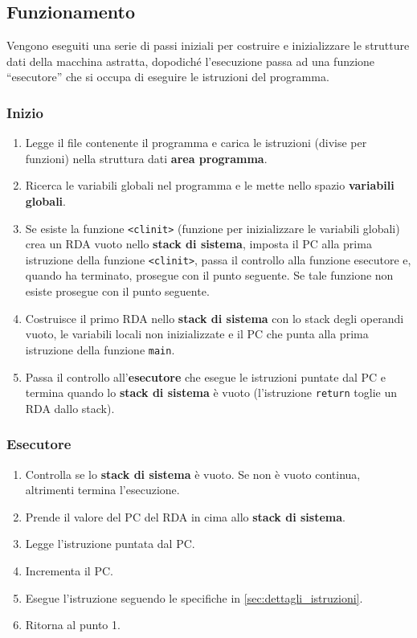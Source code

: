 \subsection{Funzionamento}
Vengono eseguiti una serie di passi iniziali per costruire e inizializzare le strutture dati della macchina astratta, dopodich\'e l'esecuzione passa ad una funzione ``esecutore'' che si occupa di eseguire le istruzioni del programma.

\subsubsection*{Inizio}
\begin{enumerate}
  \item Legge il file contenente il programma e carica le istruzioni (divise per funzioni) nella struttura dati \textbf{area programma}.
  \item Ricerca le variabili globali nel programma e le mette nello spazio \textbf{variabili globali}.
  \item Se esiste la funzione \texttt{<clinit>} (funzione per inizializzare le variabili globali) crea un RDA vuoto nello \textbf{stack di sistema}, imposta il PC alla prima istruzione della funzione \texttt{<clinit>}, passa il controllo alla funzione esecutore e, quando ha terminato, prosegue con il punto seguente. Se tale funzione non esiste prosegue con il punto seguente.
  \item Costruisce il primo RDA nello \textbf{stack di sistema} con lo stack degli operandi vuoto, le variabili locali non inizializzate e il PC che punta alla prima istruzione della funzione \texttt{main}.
  \item Passa il controllo all'\textbf{esecutore} che esegue le istruzioni puntate dal PC e termina quando lo \textbf{stack di sistema} \`e vuoto (l'istruzione \texttt{return} toglie un RDA dallo stack).
\end{enumerate}

\subsubsection*{Esecutore}
\begin{enumerate}
  \item Controlla se lo \textbf{stack di sistema} \`e vuoto. Se non \`e vuoto continua, altrimenti termina l'esecuzione.
  \item Prende il valore del PC del RDA in cima allo \textbf{stack di sistema}.
  \item Legge l'istruzione puntata dal PC.
  \item Incrementa il PC.
  \item Esegue l'istruzione seguendo le specifiche in \ref{sec:dettagli_istruzioni}.
  \item Ritorna al punto 1.
\end{enumerate}
